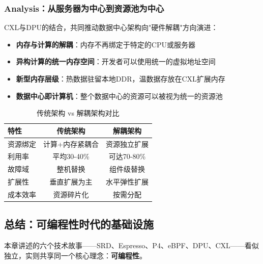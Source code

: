 \subsubsection{Analysis：从服务器为中心到资源池为中心}

CXL与DPU的结合，共同推动数据中心架构向"硬件解耦"方向演进：

\begin{itemize}
    \item \textbf{内存与计算的解耦}：内存不再绑定于特定的CPU或服务器
    \item \textbf{异构计算的统一内存空间}：开发者可以使用统一的虚拟地址空间
    \item \textbf{新型内存层级}：热数据驻留本地DDR，温数据存放在CXL扩展内存
    \item \textbf{数据中心即计算机}：整个数据中心的资源可以被视为统一的资源池
\end{itemize}

\begin{table}[h]
\centering
\caption{传统架构 vs 解耦架构对比}
\begin{tabular}{lcc}
\toprule
\textbf{特性} & \textbf{传统架构} & \textbf{解耦架构} \\
\midrule
资源绑定 & 计算+内存紧耦合 & 资源独立扩展 \\
利用率 & 平均30-40\% & 可达70-80\% \\
故障域 & 整机替换 & 组件级替换 \\
扩展性 & 垂直扩展为主 & 水平弹性扩展 \\
成本效率 & 资源碎片化 & 按需分配 \\
\bottomrule
\end{tabular}
\end{table}

\subsection{总结：可编程性时代的基础设施}

本章讲述的六个技术故事——SRD、Espresso、P4、eBPF、DPU、CXL——看似独立，实则共享同一个核心理念：\textbf{可编程性}。

